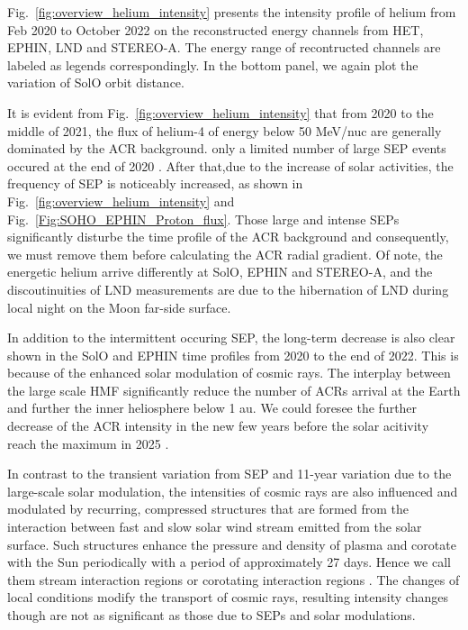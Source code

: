Fig.~\ref{fig:overview_helium_intensity} presents the intensity profile of helium from Feb 2020 to October 2022 on the reconstructed energy channels from \ac{HET}, \ac{EPHIN}, \ac{LND} and \ac{STEREO}-A. The energy range of recontructed channels are labeled as legends correspondingly. In the bottom panel, we again plot the variation of \ac{SolO} orbit distance.

It is evident from Fig.~\ref{fig:overview_helium_intensity} that from 2020 to the middle of 2021, the flux of helium-4 of energy below 50 MeV/nuc are generally dominated by the \ac{ACR} background.
only a limited number of large \ac{SEP} events occured at the end of 2020 \cite{Kolhoff2021AA}. After that,due to the increase of solar activities, the frequency of \ac{SEP} is noticeably increased, as shown in Fig.~\ref{fig:overview_helium_intensity} and Fig.~\ref{Fig:SOHO_EPHIN_Proton_flux}.
Those large and intense \acp{SEP} significantly disturbe the time profile of the \ac{ACR} background and consequently, we must remove them before calculating the \ac{ACR} radial gradient. 
Of note, the energetic helium arrive differently at \ac{SolO}, \ac{EPHIN} and \ac{STEREO}-A, and the discoutinuities of \ac{LND} measurements are due to the hibernation of \ac{LND} during local night on the Moon far-side surface.

In addition to the intermittent occuring \ac{SEP}, the long-term decrease is also clear shown in the \ac{SolO} and \ac{EPHIN} time profiles from 2020 to the end of 2022. This is because of the enhanced solar modulation of cosmic rays. The interplay between the large scale \ac{HMF} significantly reduce the number of \acp{ACR} arrival at the Earth and further the inner heliosphere below 1 au. We could foresee the further decrease of the \ac{ACR} intensity in the new few years before the solar acitivity reach the maximum in 2025 \citep{}.

In contrast to the transient variation from \ac{SEP} and 11-year variation due to the large-scale solar modulation, the intensities of cosmic rays are also influenced and modulated by recurring, compressed structures that are formed from the interaction between fast and slow solar wind stream emitted from the solar surface. Such structures enhance the pressure and density of plasma and corotate with the Sun periodically with a period of approximately 27 days. Hence we call them stream interaction regions or corotating interaction regions \citep{Burlaga1974JGR, Gosling1976JGR, Richardson2004SSRv}. The changes of local conditions modify the transport of cosmic rays, resulting intensity changes though are not as significant as those due to \acp{SEP} and solar modulations.

